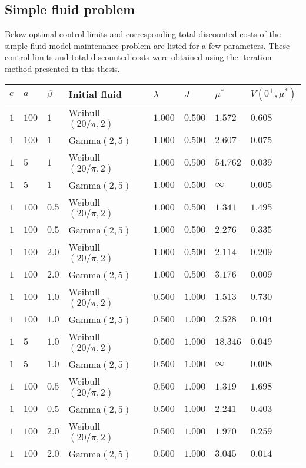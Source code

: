 \documentclass[a4paper]{thesis}
\theoremstyle{definition}
\begin{document}
\begin{appendices}
\section{Simple fluid problem}
Below optimal control limits and corresponding total discounted costs of the simple fluid model maintenance problem are listed for a few parameters.
These control limits and total discounted costs were obtained using the iteration method presented in this thesis.
\begin{tabularx}{\linewidth}{llllllll}\label{table:SimpleFluidComputations}
	$c$        & $a$ & $\beta$ & Initial fluid & $\lambda$ & $J$ & $\mu^*$ & $V(0^+,\mu^*)$        \\
	\hline    
	  $1$ & $100$ & $1$ & Weibull$(20/\pi,2)$ & $1.000$ & $0.500$ & $1.572$ & $0.608$ \\ 
	  $1$ & $100$ & $1$ & Gamma$(2,5)$ & $1.000$ & $0.500$ & $2.607$ & $0.075$ \\ 
	  $1$ & $5$ & $1$ & Weibull$(20/\pi,2)$ & $1.000$ & $0.500$ & $54.762$ & $0.039$ \\ 
	  $1$ & $5$ & $1$ & Gamma$(2,5)$ & $1.000$ & $0.500$ & $\infty$ & $0.005$ \\ 
	  $1$ & $100$ & $0.5$ & Weibull$(20/\pi,2)$ & $1.000$ & $0.500$ & $1.341$ & $1.495$ \\ 
	  $1$ & $100$ & $0.5$ & Gamma$(2,5)$ & $1.000$ & $0.500$ & $2.276$ & $0.335$ \\ 
	  $1$ & $100$ & $2.0$ & Weibull$(20/\pi,2)$ & $1.000$ & $0.500$ & $2.114$ & $0.209$ \\ 
	  $1$ & $100$ & $2.0$ & Gamma$(2,5)$ & $1.000$ & $0.500$ & $3.176$ & $0.009$ \\ 
	  $1$ & $100$ & $1.0$ & Weibull$(20/\pi,2)$ & $0.500$ & $1.000$ & $1.513$ & $0.730$ \\ 
	  $1$ & $100$ & $1.0$ & Gamma$(2,5)$ & $0.500$ & $1.000$ & $2.528$ & $0.104$ \\ 
	  $1$ & $5$ & $1.0$ & Weibull$(20/\pi,2)$ & $0.500$ & $1.000$ & $18.346$ & $0.049$ \\ 
	  $1$ & $5$ & $1.0$ & Gamma$(2,5)$ & $0.500$ & $1.000$ & $\infty$ & $0.008$ \\ 
	  $1$ & $100$ & $0.5$ & Weibull$(20/\pi,2)$ & $0.500$ & $1.000$ & $1.319$ & $1.698$ \\ 
	  $1$ & $100$ & $0.5$ & Gamma$(2,5)$ & $0.500$ & $1.000$ & $2.241$ & $0.403$ \\ 
	  $1$ & $100$ & $2.0$ & Weibull$(20/\pi,2)$ & $0.500$ & $1.000$ & $1.970$ & $0.259$ \\ 
	  $1$ & $100$ & $2.0$ & Gamma$(2,5)$ & $0.500$ & $1.000$ & $3.045$ & $0.014$ \\ 
\end{tabularx}

\end{appendices}
\end{document}
